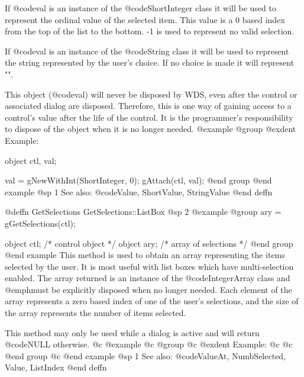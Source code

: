 If @code{val} is an instance of the @code{ShortInteger} class it will
be used to represent the ordinal value of the selected item.  This value
is a 0 based index from the top of the list to the bottom.  -1 is used
to represent no valid selection.

If @code{val} is an instance of the @code{String} class it will be used
to represent the string represented by the user's choice.  If no choice is
made it will represent "".

This object (@code{val}) will never be disposed by WDS, even after
the control or associated dialog are disposed.  Therefore, this
is one way of gaining access to a control's value after the life
of the control.  It is the programmer's responsibility to dispose of
the object when it is no longer needed.
@example
@group
@exdent Example:

object  ctl, val;

val = gNewWithInt(ShortInteger, 0);
gAttach(ctl, val);
@end group
@end example
@sp 1
See also:  @code{Value, ShortValue, StringValue}
@end deffn
















@deffn {GetSelections} GetSelections::ListBox
@sp 2
@example
@group
ary = gGetSelections(ctl);

object  ctl;   /*  control object       */
object  ary;   /*  array of selections  */
@end group
@end example
This method is used to obtain an array representing the items selected
by the user.  It is most useful with list boxes which have multi-selection
enabled.  The array returned is an instance of the @code{IntegerArray} class
and @emph{must} be explicitly disposed when no longer needed.  Each element
of the array represents a zero based index of one of the user's selections,
and the size of the array represents the number of items selected.

This method may only be used while a dialog is active and will return
@code{NULL} otherwise.
@c @example
@c @group
@c @exdent Example:
@c 
@c @end group
@c @end example
@sp 1
See also:  @code{ValueAt, NumbSelected, Value, ListIndex}
@end deffn
















